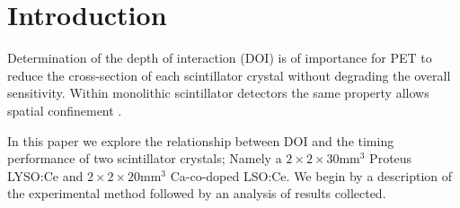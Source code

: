 \section{Introduction} 
Determination of the depth of interaction (DOI) is of importance for PET to reduce the cross-section of each scintillator crystal without degrading the overall sensitivity\cite{Moses_2001}\cite{Humm_Rosenfeld_Del_Guerra_2003}. Within monolithic scintillator detectors the same property allows spatial confinement \cite{am_Borghi_Seifert_Schaart_2013}\cite{Maas_Bruyndonckx_Schaart_2012}.

In this paper we explore the relationship between DOI and the timing performance of two scintillator crystals; Namely a $2\times2\times30$mm$^3$ Proteus LYSO:Ce and $2\times2\times20$mm$^3$ Ca-co-doped LSO:Ce. We begin by a description of the experimental method followed by an analysis of results collected.